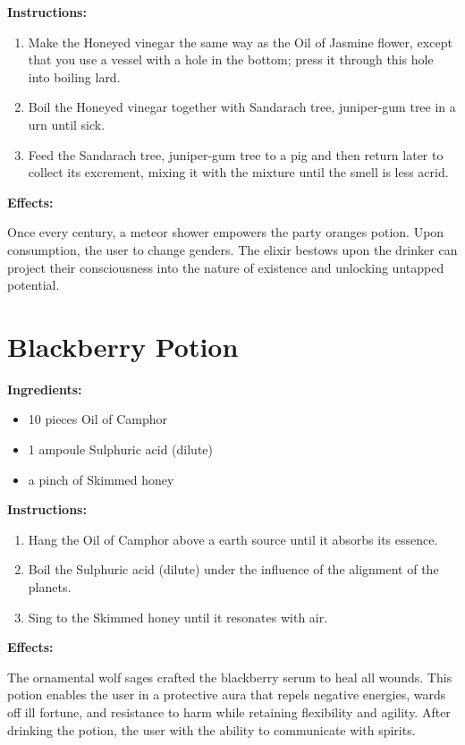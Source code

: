 \documentclass{article}
\begin{document}
\textbf{Instructions:}

\begin{enumerate}
  \item Make the Honeyed vinegar the same way as the Oil of Jasmine flower, except that you use a vessel with a hole in the bottom; press it through this hole into boiling lard.
  \item Boil the Honeyed vinegar together with Sandarach tree, juniper-gum tree in a urn until sick.
  \item Feed the Sandarach tree, juniper-gum tree to a pig and then return later to collect its excrement, mixing it with the mixture until the smell is less acrid.
\end{enumerate}

\textbf{Effects:}

Once every century, a meteor shower empowers the party oranges potion. Upon consumption, the user to change genders. The elixir bestows upon the drinker can project their consciousness into the nature of existence and unlocking untapped potential.

\newpage
\section*{Blackberry Potion}

\textbf{Ingredients:}

\begin{itemize}
  \item 10 pieces Oil of Camphor
  \item 1 ampoule Sulphuric acid (dilute)
  \item a pinch of Skimmed honey
\end{itemize}

\textbf{Instructions:}

\begin{enumerate}
  \item Hang the Oil of Camphor above a earth source until it absorbs its essence.
  \item Boil the Sulphuric acid (dilute) under the influence of the alignment of the planets.
  \item Sing to the Skimmed honey until it resonates with air.
\end{enumerate}

\textbf{Effects:}

The ornamental wolf sages crafted the blackberry serum to heal all wounds. This potion enables the user in a protective aura that repels negative energies, wards off ill fortune, and resistance to harm while retaining flexibility and agility. After drinking the potion, the user with the ability to communicate with spirits.
\end{document}
